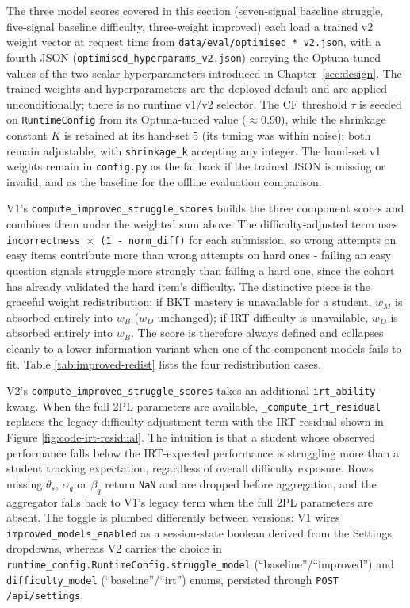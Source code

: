 The three model scores covered in this section (seven-signal baseline struggle, five-signal baseline difficulty, three-weight improved) each load a trained v2 weight vector at request time from \texttt{data/eval/optimised\_*\_v2.json}, with a fourth JSON (\texttt{optimised\_hyperparams\_v2.json}) carrying the Optuna-tuned values of the two scalar hyperparameters introduced in Chapter~\ref{sec:design}.
The trained weights and hyperparameters are the deployed default and are applied unconditionally; there is no runtime v1/v2 selector.
The CF threshold $\tau$ is seeded on \texttt{RuntimeConfig} from its Optuna-tuned value ($\approx 0.90$), while the shrinkage constant $K$ is retained at its hand-set $5$ (its tuning was within noise); both remain adjustable, with \texttt{shrinkage\_k} accepting any integer.
The hand-set v1 weights remain in \texttt{config.py} as the fallback if the trained JSON is missing or invalid, and as the baseline for the offline evaluation comparison.


V1's \texttt{compute\_improved\_struggle\_scores} builds the three component scores and combines them under the weighted sum above.
The difficulty-adjusted term uses \texttt{incorrectness $\times$ (1 - norm\_diff)} for each submission, so wrong attempts on easy items contribute more than wrong attempts on hard ones - failing an easy question signals struggle more strongly than failing a hard one, since the cohort has already validated the hard item's difficulty.
The distinctive piece is the graceful weight redistribution: if BKT mastery is unavailable for a student, $w_M$ is absorbed entirely into $w_B$ ($w_D$ unchanged); if IRT difficulty is unavailable, $w_D$ is absorbed entirely into $w_B$.
The score is therefore always defined and collapses cleanly to a lower-information variant when one of the component models fails to fit.
Table \ref{tab:improved-redist} lists the four redistribution cases.

V2's \texttt{compute\_improved\_struggle\_scores} takes an additional \texttt{irt\_ability} kwarg.
When the full 2PL parameters are available, \texttt{\_compute\_irt\_residual} replaces the legacy difficulty-adjustment term with the IRT residual shown in Figure \ref{fig:code-irt-residual}.
The intuition is that a student whose observed performance falls below the IRT-expected performance is struggling more than a student tracking expectation, regardless of overall difficulty exposure.
Rows missing $\theta_s$, $\alpha_q$ or $\beta_q$ return \texttt{NaN} and are dropped before aggregation, and the aggregator falls back to V1's legacy term when the full 2PL parameters are absent.
The toggle is plumbed differently between versions: V1 wires \texttt{improved\_models\_enabled} as a session-state boolean derived from the Settings dropdowns, whereas V2 carries the choice in \texttt{runtime\_config.RuntimeConfig.struggle\_model} (``baseline''/``improved'') and \texttt{difficulty\_model} (``baseline''/``irt'') enums, persisted through \texttt{POST /api/settings}.

